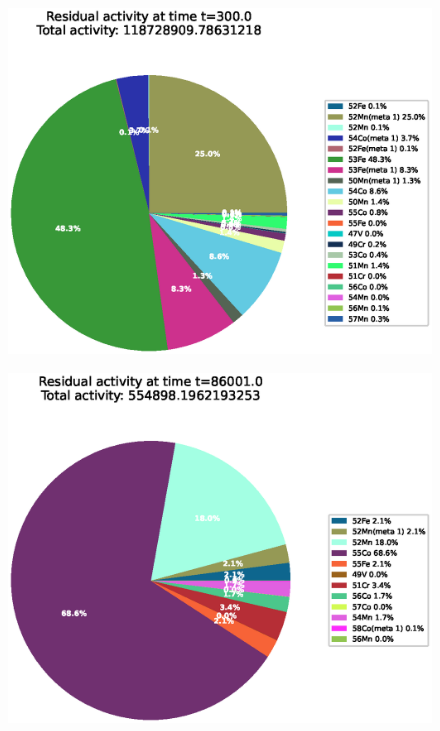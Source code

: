 \begin{figure}[!htb]
\centering
\includegraphics[width=0.8\linewidth]{chapters/activity_code/fe-activity-v2/residual-activity/0100_300.eps}
\caption{}
\label{fig:activity-v2-residual-activity-300s}
\end{figure}

\begin{figure}[!htb]
\centering
\includegraphics[width=0.8\linewidth]{chapters/activity_code/fe-activity-v2/residual-activity/0166_86001.eps}
\caption{}
\label{fig:activity-v2-residual-activity-86001s}
\end{figure}


